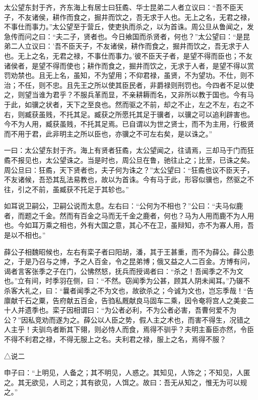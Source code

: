 \documentclass[]{article}
\begin{document}
太公望东封于齐，齐东海上有居士曰狂矞、华士昆弟二人者立议曰：``吾不臣天子，不友诸侯，耕作而食之，掘井而饮之，吾无求于人也。无上之名，无君之禄，不事仕而事力。''太公望至于营丘，使吏执而杀之，以为首诛。周公旦从鲁闻之，发急传而问之曰：``夫二子，贤者也。今日飨国而杀贤者，何也？''太公望曰：``是昆弟二人立议曰：'吾不臣天子，不友诸侯，耕作而食之，掘井而饮之，吾无求于人也。无上之名，无君之禄，不事仕而事力。'彼不臣天子者，是望不得而臣也；不友诸侯者，是望不得而使也；耕作而食之，掘井而饮之，无求于人者，是望不得以赏罚劝禁也。且无上名，虽知，不为望用；不仰君禄，虽贤，不为望功。不仕，则不治；不任，则不忠。且先王之所以使其臣民者，非爵禄则刑罚也。今四者不足以使之，则望当谁为君乎？不服兵革而显，不亲耕耨而名，又非所以教于国也。今有马于此，如骥之状者，天下之至良也。然而驱之不前，却之不止，左之不左，右之不右，则臧获虽贱，不托其足。臧获之所愿托其足于骥者，以骥之可以追利辟害也。今不为人用，臧获虽贱，不托其足焉。已自谓以为世之贤士，而不为主用，行极贤而不用于君，此非明主之所以臣也，亦骥之不可左右矣，是以诛之。''

一曰：太公望东封于齐。海上有贤者狂矞，太公望闻之，往请焉，三却马于门而狂矞不报见也，太公望诛之。当是时也，周公旦在鲁，驰往止之；比至，已诛之矣。周公旦曰：狂矞，天下贤者也，夫子何为诛之？''太公望曰：``狂矞也议不臣天子，不友诸候，吾恐其乱法易教也，故以为首诛。今有马于此，形容似骥也，然驱之不往，引之不前，虽臧获不托足于其轸也。''

如耳说卫嗣公，卫嗣公说而太息。左右曰：``公何为不相也？''公曰：``夫马似鹿者，而题之千金。然而有百金之马而无千金之鹿者，何也？马为人用而鹿不为人用也。今如耳万乘之相也，外有大国之意，其心不在卫，虽辩知，亦不为寡人用，吾是以不相也。''

薛公子相魏昭候也，左右有栾子者曰阳胡，潘，其于王甚重，而不为薛公。薛公患之，于是乃召与之博，予之人百金，令之昆弟博；俄又益之人二百金。方博有问，谒者言客张季之子在门，公怫然怒，抚兵而授谒者曰：``杀之！吾闻季之不为文也。''立有间，时季羽在侧，曰：``不然。窃闻季为公甚，顾其人阴未闻耳。''乃辍不杀客大礼之，曰：``曩者闻季之不为文也，故欲杀之；今诚为文也，岂忘季哉！``告廪献千石之粟，告府献五百金，告驺私厩献良马固车二乘，因令奄将宫人之美妾二十人并遗季也。栾子因相谓曰：``为公者必利，不为公者必害，吾曹何爱不为公？''因私竞劝而遂为之。薛公以人臣之势，假人主之术也，而害不得生，况错之人主乎！夫驯鸟者断其下翎，则必恃人而食，焉得不驯乎？夫明主畜臣亦然，令臣不得不利君之禄，不得无服上之名。夫利君之禄，服上之名，焉得不服？

△说二

申子曰：``上明见，人备之；其不明见，人惑之。其知见，人饰之；不知见，人匿之。其无欲见，人司之；其有欲见，人饵之。故曰：吾无从知之，惟无为可以规之。''
\end{document}
